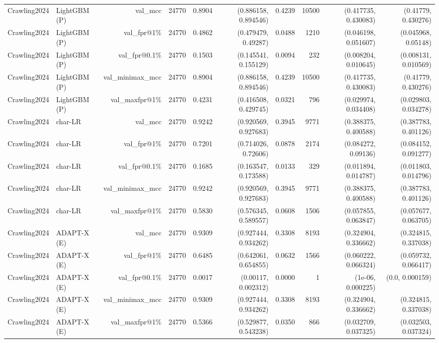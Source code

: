 \begin{table}[t]
\begin{tabular}{llrrrrrrrr}
Crawling2024 & LightGBM (P) & val\_mcc & 24770 & 0.8904 & (0.886158, 0.894546) & 0.4239 & 10500 & (0.417735, 0.430083) & (0.41779, 0.430276) \\
Crawling2024 & LightGBM (P) & val\_fpr@1\% & 24770 & 0.4862 & (0.479479, 0.49287) & 0.0488 & 1210 & (0.046198, 0.051607) & (0.045968, 0.05148) \\
Crawling2024 & LightGBM (P) & val\_fpr@0.1\% & 24770 & 0.1503 & (0.145541, 0.155129) & 0.0094 & 232 & (0.008204, 0.010645) & (0.008131, 0.010569) \\
Crawling2024 & LightGBM (P) & val\_minimax\_mcc & 24770 & 0.8904 & (0.886158, 0.894546) & 0.4239 & 10500 & (0.417735, 0.430083) & (0.41779, 0.430276) \\
Crawling2024 & LightGBM (P) & val\_maxfpr@1\% & 24770 & 0.4231 & (0.416508, 0.429745) & 0.0321 & 796 & (0.029974, 0.034408) & (0.029803, 0.034278) \\
Crawling2024 & char-LR & val\_mcc & 24770 & 0.9242 & (0.920569, 0.927683) & 0.3945 & 9771 & (0.388375, 0.400588) & (0.387783, 0.401126) \\
Crawling2024 & char-LR & val\_fpr@1\% & 24770 & 0.7201 & (0.714026, 0.72606) & 0.0878 & 2174 & (0.084272, 0.09136) & (0.084152, 0.091277) \\
Crawling2024 & char-LR & val\_fpr@0.1\% & 24770 & 0.1685 & (0.163547, 0.173588) & 0.0133 & 329 & (0.011894, 0.014787) & (0.011803, 0.014796) \\
Crawling2024 & char-LR & val\_minimax\_mcc & 24770 & 0.9242 & (0.920569, 0.927683) & 0.3945 & 9771 & (0.388375, 0.400588) & (0.387783, 0.401126) \\
Crawling2024 & char-LR & val\_maxfpr@1\% & 24770 & 0.5830 & (0.576345, 0.589557) & 0.0608 & 1506 & (0.057855, 0.063847) & (0.057677, 0.063705) \\
Crawling2024 & ADAPT-X (E) & val\_mcc & 24770 & 0.9309 & (0.927444, 0.934262) & 0.3308 & 8193 & (0.324904, 0.336662) & (0.324815, 0.337038) \\
Crawling2024 & ADAPT-X (E) & val\_fpr@1\% & 24770 & 0.6485 & (0.642061, 0.654855) & 0.0632 & 1566 & (0.060222, 0.066324) & (0.059732, 0.066417) \\
Crawling2024 & ADAPT-X (E) & val\_fpr@0.1\% & 24770 & 0.0017 & (0.00117, 0.002312) & 0.0000 & 1 & (1e-06, 0.000225) & (0.0, 0.000159) \\
Crawling2024 & ADAPT-X (E) & val\_minimax\_mcc & 24770 & 0.9309 & (0.927444, 0.934262) & 0.3308 & 8193 & (0.324904, 0.336662) & (0.324815, 0.337038) \\
Crawling2024 & ADAPT-X (E) & val\_maxfpr@1\% & 24770 & 0.5366 & (0.529877, 0.543238) & 0.0350 & 866 & (0.032709, 0.037325) & (0.032503, 0.037324) \\

\end{tabular}
\end{table}
